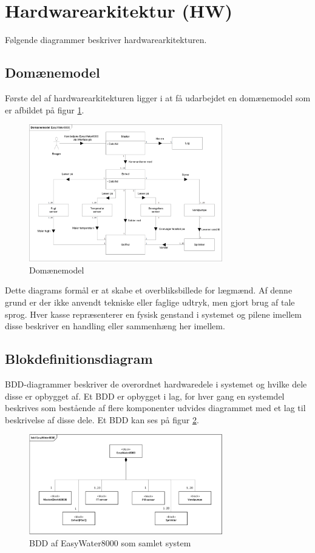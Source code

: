 \section{Hardwarearkitektur (HW)}
Følgende diagrammer beskriver hardwarearkitekturen.

\subsection{Domænemodel}
Første del af hardwarearkitekturen ligger i at få udarbejdet en domænemodel som er afbildet	 på figur \ref{lab:Domainmodel}.

\begin{figure}[H]
  \centering
    \includegraphics[width=0.75\textwidth]{Billeder/Domainmodel}
    \caption{Domænemodel}
    \label{lab:Domainmodel}
\end{figure}

Dette diagrams formål er at skabe et overbliksbillede for lægmænd. Af denne grund er der ikke anvendt tekniske eller faglige udtryk, men gjort brug af tale sprog. Hver kasse repræsenterer en fysisk genstand i systemet og pilene imellem disse beskriver en handling eller sammenhæng her imellem.

\subsection{Blokdefinitionsdiagram}
BDD-diagrammer beskriver de overordnet hardwaredele i systemet og hvilke dele disse er opbygget af. Et BDD er opbygget i lag, for hver gang en systemdel beskrives som bestående af flere komponenter udvides diagrammet med et lag til beskrivelse af disse dele. Et BDD kan ses på figur \ref{lab:BDD}. 

\begin{figure}[H]
  \centering
    \includegraphics[width=0.75\textwidth]{Billeder/BDD}
    \caption{BDD af EasyWater8000 som samlet system}
    \label{lab:BDD}
\end{figure}

